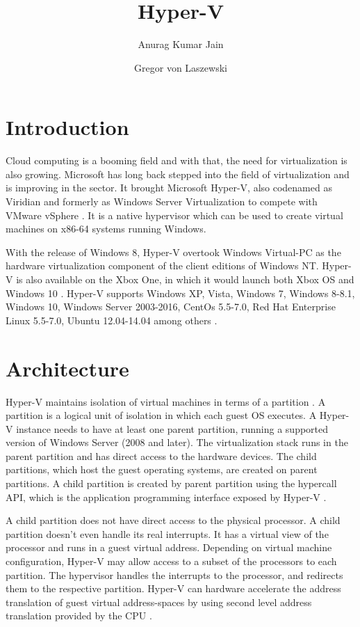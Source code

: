 \documentclass[9pt,twocolumn,twoside]{../../styles/osajnl}
\title{Hyper-V}
\author[1]{Anurag Kumar Jain}
\author[1,*]{Gregor von Laszewski}
\affil[1]{School of Informatics and Computing, Bloomington, IN 47408, U.S.A.}
\affil[*]{Corresponding authors: laszewski@gmail.com}
\begin{document}
\maketitle

\section{Introduction}

Cloud computing is a booming field and with that, the need for
virtualization is also growing. Microsoft has long back stepped into
the field of virtualization and is improving in the sector. It brought
Microsoft Hyper-V, also codenamed as Viridian and formerly as Windows
Server Virtualization to compete with VMware vSphere
\cite{www-hyperv-wikipedia}. It is a native hypervisor which can be
used to create virtual machines on x86-64 systems running Windows.

With the release of Windows 8, Hyper-V overtook Windows Virtual-PC as
the hardware virtualization component of the client editions of
Windows NT. Hyper-V is also available on the Xbox One, in which it
would launch both Xbox OS and Windows 10
\cite{www-hyperv-wikipedia}. Hyper-V supports Windows XP, Vista,
Windows 7, Windows 8-8.1, Windows 10, Windows Server 2003-2016, CentOs
5.5-7.0, Red Hat Enterprise Linux 5.5-7.0, Ubuntu 12.04-14.04 among
others \cite{www-hyperv-paper2}.

\section{Architecture}

Hyper-V maintains isolation of virtual machines in terms of a
partition \cite{www-hyperv-wikipedia}. A partition is a logical unit
of isolation in which each guest OS executes. A Hyper-V instance needs
to have at least one parent partition, running a supported version of
Windows Server (2008 and later). The virtualization stack runs in the
parent partition and has direct access to the hardware devices. The
child partitions, which host the guest operating systems, are created
on parent partitions. A child partition is created by parent partition
using the hypercall API, which is the application programming
interface exposed by Hyper-V \cite{www-hyperv-architecture}.

A child partition does not have direct access to the physical
processor. A child partition doesn't even handle its real
interrupts. It has a virtual view of the processor and runs in a guest
virtual address. Depending on virtual machine configuration, Hyper-V
may allow access to a subset of the processors to each partition. The
hypervisor handles the interrupts to the processor, and redirects them
to the respective partition. Hyper-V can hardware accelerate the
address translation of guest virtual address-spaces by using second
level address translation provided by the CPU \cite{www-hyperv-paper}.
\end{document}
